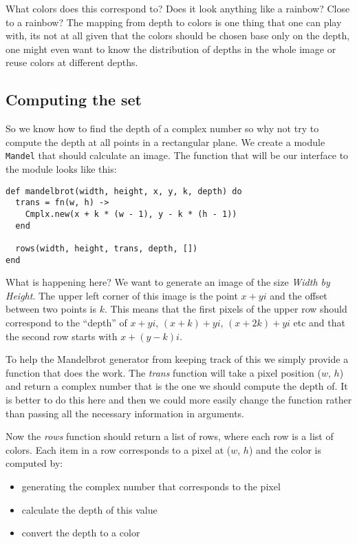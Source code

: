 \documentclass[a4paper,11pt]{article}
\begin{document}
What colors does this correspond to? Does it look anything like a
rainbow? Close to a rainbow? The mapping from depth to colors is one
thing that one can play with, its not at all given that the colors
should be chosen base only on the depth, one might even want to know
the distribution of depths in the whole image or reuse colors at
different depths.


\subsection{Computing the set}

So we know how to find the depth of a complex number so why not try to
compute the depth at all points in a rectangular plane. We create a
module {\tt Mandel} that should calculate an image. The function that
will be our interface to the module looks like this:

\begin{verbatim}
def mandelbrot(width, height, x, y, k, depth) do
  trans = fn(w, h) ->
    Cmplx.new(x + k * (w - 1), y - k * (h - 1))
  end

  rows(width, height, trans, depth, [])
end
\end{verbatim}

What is happening here? We want to generate an image of the size {\em
  Width by Height}. The upper left corner of this image is the point $x
+ yi$ and the offset between two points is $k$. This means that the
first pixels of the upper row should correspond to the ``depth'' of
$x+yi$, $(x+k) + yi$, $(x+2k) + yi$ etc and that the second row starts
with $x + (y-k)i$. 

To help the Mandelbrot generator from keeping track of this we simply
provide a function that does the work. The {\em trans} function will
take a pixel position ($w$, $h$) and return a complex number that is
the one we should compute the depth of. It is better to do this here
and then we could more easily change the function rather than passing
all the necessary information in arguments.

Now the {\em rows} function should return a list of rows, where each
row is a list of colors. Each item in a row corresponds to a pixel at
($w$, $h$) and the color is computed by:

\begin{itemize}
 \item generating the complex number that corresponds to the pixel
 \item calculate the depth of this value
 \item convert the depth to a color
\end{itemize}
\end{document}
